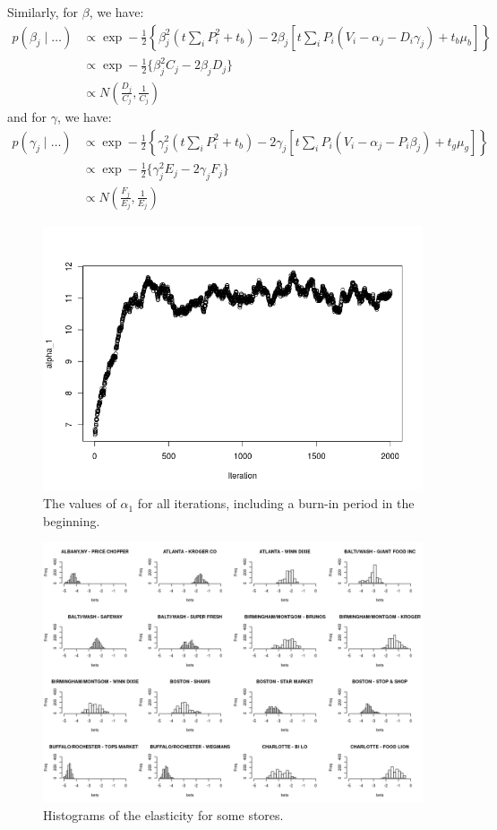 \documentclass{article}
\begin{document}
\begin{enumerate}
Similarly, for \(\beta\), we have:
\begin{align*}
p(\beta_j \mid \ldots) &\propto \exp -\frac{1}{2} \left\lbrace \beta_j^2(t \sum_i P_i^2 + t_b) - 2\beta_j \left[t\sum_i P_i(V_i - \alpha_j - D_i \gamma_j) + t_b \mu_b\right]  \right\rbrace\\
&\propto \exp -\frac{1}{2} \{ \beta_j^2 C_j - 2 \beta_j D_j \}\\
&\propto N\left(\frac{D_j}{C_j} , \frac{1}{C_j}\right)
\end{align*}
and for \(\gamma\), we have:
\begin{align*}
p(\gamma_j \mid \ldots) &\propto \exp -\frac{1}{2} \left\lbrace \gamma_j^2(t \sum_i P_i^2 + t_b) - 2\gamma_j \left[t\sum_i P_i(V_i - \alpha_j - P_i \beta_j) + t_g \mu_g\right]  \right\rbrace\\
&\propto \exp -\frac{1}{2} \{ \gamma_j^2 E_j - 2 \gamma_j F_j \}\\
&\propto N\left(\frac{F_j}{E_j} , \frac{1}{E_j}\right)
\end{align*}
\begin{figure}[h]
\includegraphics[width=\textwidth]{alpha1.jpeg}
\caption{The values of \(\alpha_1\) for all iterations, including a burn-in period in the beginning.}
\end{figure}


\begin{figure}[h]
\includegraphics[width=\textwidth]{beta.jpeg}
\caption{Histograms of the elasticity for some stores.}
\end{figure}



\end{enumerate}
\end{document}
